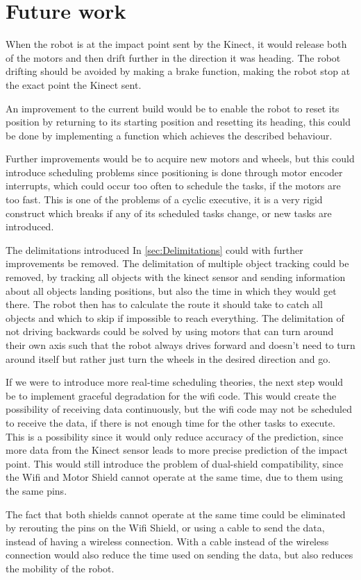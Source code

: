 \chapter{Future work}
\label{chap:FutureWork}
When the robot is at the impact point sent by the Kinect, it would release both of the motors and then drift further in the direction it was heading. The robot drifting should be avoided by making a brake function, making the robot stop at the exact point the Kinect sent.

An improvement to the current build would be to enable the robot to reset its position by returning to its starting position and resetting its heading, this could be done by implementing a function which achieves the described behaviour.

Further improvements would be to acquire new motors and wheels, but this could introduce scheduling problems since positioning is done through motor encoder interrupts, which could occur too often to schedule the tasks, if the motors are too fast.
This is one of the problems of a cyclic executive, it is a very rigid construct which breaks if any of its scheduled tasks change, or new tasks are introduced.

The delimitations introduced In \ref{sec:Delimitations} could with further improvements be removed. The delimitation of multiple object tracking could be removed, by tracking all objects with the kinect sensor and sending information about all objects landing positions, but also the time in which they would get there. The robot then has to calculate the route it should take to catch all objects and which to skip if impossible to reach everything. The delimitation of not driving backwards could be solved by using motors that can turn around their own axis such that the robot always drives forward and doesn’t need to turn around itself but rather just turn the wheels in the desired direction and go.

If we were to introduce more real-time scheduling theories, the next step would be to implement graceful degradation for the wifi code. This would create the possibility of receiving data continuously, but the wifi code may not be scheduled to receive the data, if there is not enough time for the other tasks to execute. This is a possibility since it would only reduce accuracy of the prediction, since more data from the Kinect sensor leads to more precise prediction of the impact point. This would still introduce the problem of dual-shield compatibility, since the Wifi and Motor Shield cannot operate at the same time, due to them using the same pins.

The fact that both shields cannot operate at the same time could be eliminated by rerouting the pins on the Wifi Shield, or using a cable to send the data, instead of having a wireless connection. With a cable instead of the wireless connection would also reduce the time used on sending the data, but also reduces the mobility of the robot.